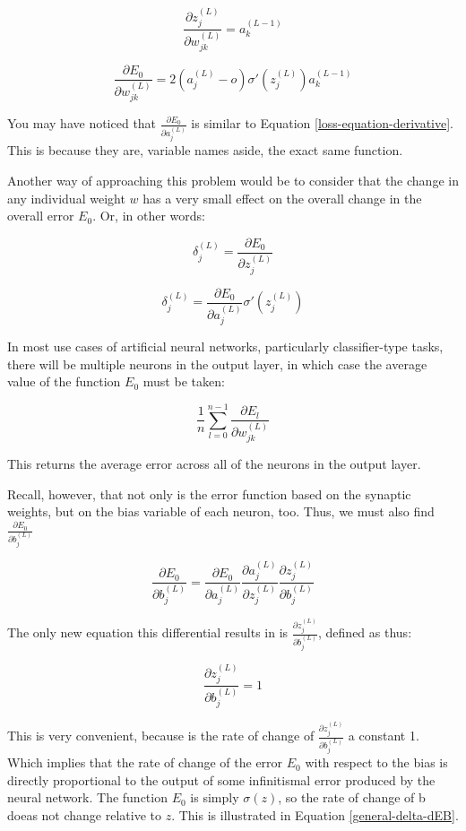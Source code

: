 \documentclass[12pt]{article}
\begin{document}
\[ \frac{\partial z_j^{(L)}}{\partial w_{jk}^{(L)}} = a_k^{(L-1)}\]

\begin{equation} \label{chain-rule-applied}
    \frac{\partial E_0}{\partial w_{jk}^{(L)}} = 2 (a_j^{(L)} - o) \sigma '(z_j^{(L)}) a_k^{(L-1)}
\end{equation}

You may have noticed that $\frac{\partial E_0}{\partial a_j^{(L)}}$ is similar to Equation \ref{loss-equation-derivative}. This is because they are, variable names aside, the exact same function.

Another way of approaching this problem would be to consider that the change in any individual weight $w$ has a very small effect on the overall change in the overall error $E_0$. Or, in other words:

\[ \delta_{j}^{(L)} = \frac{\partial E_0}{\partial z_j^{(L)}} \]

\[ \delta_j^{(L)} = \frac{\partial E_0}{\partial a_j^{(L)}} \sigma '(z_j^{(L)})\]

In most use cases of artificial neural networks, particularly classifier-type tasks, there will be multiple neurons in the output layer, in which case the average value of the function $E_0$ must be taken:

\[ \frac{1}{n}\sum_{l=0}^{n-1} \frac{\partial E_l}{\partial w_{jk}^{(L)}}\]

This returns the average error across all of the neurons in the output layer.

Recall, however, that not only is the error function based on the synaptic weights, but on the bias variable of each neuron, too. Thus, we must also find $\frac{\partial E_0}{\partial b_j^{(L)}}$

\[ \frac{\partial E_0}{\partial b_j^{(L)}} = \frac{\partial E_0}{\partial a_j^{(L)}}  \frac{\partial a_j^{(L)}}{\partial z_j^{(L)}} \frac{\partial z_j^{(L)}}{\partial b_j^{(L)}}\]

The only new equation this differential results in is $\frac{\partial z_j^{(L)}}{\partial b_j^{(L)}}$, defined as thus:

\[\frac{\partial z_j^{(L)}}{\partial b_j^{(L)}} = 1 \]

This is very convenient, because is the rate of change of $\frac{\partial z_j^{(L)}}{\partial b_j^{(L)}}$ a constant 1. Which implies that the rate of change of the error $E_0$ with respect to the bias is directly proportional to the output of some infinitismal error produced by the neural network. The function $E_0$ is simply $\sigma(z)$, so the rate of change of b doeas not change relative to $z$. This is illustrated in Equation \ref{general-delta-dEB}.
\end{document}
